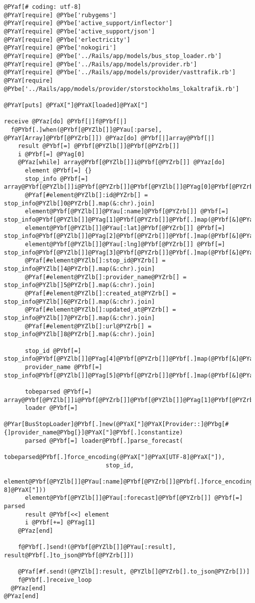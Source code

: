 \begin{Verbatim}[commandchars=@\[\]]
@PYaf[# coding: utf-8]
@PYaY[require] @PYbe['rubygems']
@PYaY[require] @PYbe['active_support/inflector']
@PYaY[require] @PYbe['active_support/json']
@PYaY[require] @PYbe['erlectricity']
@PYaY[require] @PYbe['nokogiri']
@PYaY[require] @PYbe['../Rails/app/models/bus_stop_loader.rb']
@PYaY[require] @PYbe['../Rails/app/models/provider.rb']
@PYaY[require] @PYbe['../Rails/app/models/provider/vasttrafik.rb']
@PYaY[require] @PYbe['../Rails/app/models/provider/storstockholms_lokaltrafik.rb']

@PYaY[puts] @PYaX["]@PYaX[loaded]@PYaX["]

receive @PYaz[do] @PYbf[|]f@PYbf[|]
  f@PYbf[.]when(@PYbf[@PYZlb[]]@PYau[:parse], @PYaY[Array]@PYbf[@PYZrb[]]) @PYaz[do] @PYbf[|]array@PYbf[|]
    result @PYbf[=] @PYbf[@PYZlb[]]@PYbf[@PYZrb[]]
    i @PYbf[=] @PYag[0]
    @PYaz[while] array@PYbf[@PYZlb[]]i@PYbf[@PYZrb[]] @PYaz[do]
      element @PYbf[=] {}
      stop_info @PYbf[=] array@PYbf[@PYZlb[]]i@PYbf[@PYZrb[]]@PYbf[@PYZlb[]]@PYag[0]@PYbf[@PYZrb[]]
      @PYaf[#element@PYZlb[]:id@PYZrb[] = stop_info@PYZlb[]0@PYZrb[].map(&:chr).join]
      element@PYbf[@PYZlb[]]@PYau[:name]@PYbf[@PYZrb[]] @PYbf[=] stop_info@PYbf[@PYZlb[]]@PYag[1]@PYbf[@PYZrb[]]@PYbf[.]map(@PYbf[&]@PYau[:chr])@PYbf[.]join
      element@PYbf[@PYZlb[]]@PYau[:lat]@PYbf[@PYZrb[]] @PYbf[=] stop_info@PYbf[@PYZlb[]]@PYag[2]@PYbf[@PYZrb[]]@PYbf[.]map(@PYbf[&]@PYau[:chr])@PYbf[.]join
      element@PYbf[@PYZlb[]]@PYau[:lng]@PYbf[@PYZrb[]] @PYbf[=] stop_info@PYbf[@PYZlb[]]@PYag[3]@PYbf[@PYZrb[]]@PYbf[.]map(@PYbf[&]@PYau[:chr])@PYbf[.]join
      @PYaf[#element@PYZlb[]:stop_id@PYZrb[] = stop_info@PYZlb[]4@PYZrb[].map(&:chr).join]
      @PYaf[#element@PYZlb[]:provider_name@PYZrb[] = stop_info@PYZlb[]5@PYZrb[].map(&:chr).join]
      @PYaf[#element@PYZlb[]:created_at@PYZrb[] = stop_info@PYZlb[]6@PYZrb[].map(&:chr).join]
      @PYaf[#element@PYZlb[]:updated_at@PYZrb[] = stop_info@PYZlb[]7@PYZrb[].map(&:chr).join]
      @PYaf[#element@PYZlb[]:url@PYZrb[] = stop_info@PYZlb[]8@PYZrb[].map(&:chr).join]
      
      stop_id @PYbf[=] stop_info@PYbf[@PYZlb[]]@PYag[4]@PYbf[@PYZrb[]]@PYbf[.]map(@PYbf[&]@PYau[:chr])@PYbf[.]join
      provider_name @PYbf[=] stop_info@PYbf[@PYZlb[]]@PYag[5]@PYbf[@PYZrb[]]@PYbf[.]map(@PYbf[&]@PYau[:chr])@PYbf[.]join
      
      tobeparsed @PYbf[=] array@PYbf[@PYZlb[]]i@PYbf[@PYZrb[]]@PYbf[@PYZlb[]]@PYag[1]@PYbf[@PYZrb[]]
      loader @PYbf[=] 
             @PYar[BusStopLoader]@PYbf[.]new(@PYaX["]@PYaX[Provider::]@PYbg[#{]provider_name@PYbg[}]@PYaX["]@PYbf[.]constantize)
      parsed @PYbf[=] loader@PYbf[.]parse_forecast(
                             tobeparsed@PYbf[.]force_encoding(@PYaX["]@PYaX[UTF-8]@PYaX["]),
                             stop_id,
                             element@PYbf[@PYZlb[]]@PYau[:name]@PYbf[@PYZrb[]]@PYbf[.]force_encoding(@PYaX["]@PYaX[UTF-8]@PYaX["]))
      element@PYbf[@PYZlb[]]@PYau[:forecast]@PYbf[@PYZrb[]] @PYbf[=] parsed
      result @PYbf[<<] element
      i @PYbf[+=] @PYag[1]
    @PYaz[end]
    
    f@PYbf[.]send!(@PYbf[@PYZlb[]]@PYau[:result], result@PYbf[.]to_json@PYbf[@PYZrb[]])

    @PYaf[#f.send!(@PYZlb[]:result, @PYZlb[]@PYZrb[].to_json@PYZrb[])]
    f@PYbf[.]receive_loop
  @PYaz[end]
@PYaz[end]
\end{Verbatim}
